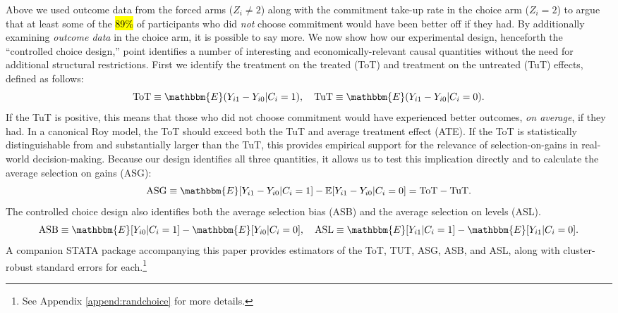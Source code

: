 \documentclass[oneside,11pt]{article}
\begin{document}
Above we used outcome data from the forced arms ($Z_i\neq 2$) along with the commitment take-up rate in the choice arm ($Z_i = 2$) to argue that at least some of the \hl{89\%} of participants who did \emph{not} choose commitment would have been better off if they had. 
By additionally examining \emph{outcome data} in the choice arm, it is possible to say more. 
We now show how our experimental design, henceforth the ``controlled choice design,'' point identifies a number of interesting and economically-relevant causal quantities without the need for additional structural restrictions.
First we identify the treatment on the treated (ToT) and treatment on the untreated (TuT) effects, defined as follows:
\[
\text{ToT} \equiv \mathbbm{E}(Y_{i1} - Y_{i0} | C_i = 1), \quad
\text{TuT} \equiv \mathbbm{E}(Y_{i1} - Y_{i0} | C_i = 0).
\]
If the TuT is positive, this means that those who did not choose commitment would have experienced better outcomes, \emph{on average}, if they had. 
In a canonical Roy model, the ToT should exceed both the TuT and average treatment effect (ATE).
If the ToT is statistically distinguishable from and substantially larger than the TuT, this provides empirical support for the relevance of selection-on-gains in real-world decision-making.
Because our design identifies all three quantities, it allows us to test this implication directly and to calculate the average selection on gains (ASG):
\[
\text{ASG} \equiv \mathbbm{E}[Y_{i1} - Y_{i0}|C_i = 1] - \mathbb{E}[Y_{i1} - Y_{i0} | C_i = 0] = \text{ToT} - \text{TuT}.
\]
The controlled choice design also identifies both the average selection bias (ASB) and the average selection on levels (ASL). 
\[
\text{ASB} \equiv \mathbbm{E}[Y_{i0}|C_i = 1] - \mathbbm{E}[Y_{i0}|C_i = 0], \quad 
\text{ASL} \equiv \mathbbm{E}[Y_{i1}|C_i = 1] - \mathbbm{E}[Y_{i1}|C_i = 0].
\]
A companion STATA package accompanying this paper provides estimators of the ToT, TUT, ASG, ASB, and ASL, along with cluster-robust standard errors for each.\footnote{See Appendix \ref{append:randchoice} for more details.}
\end{document}
